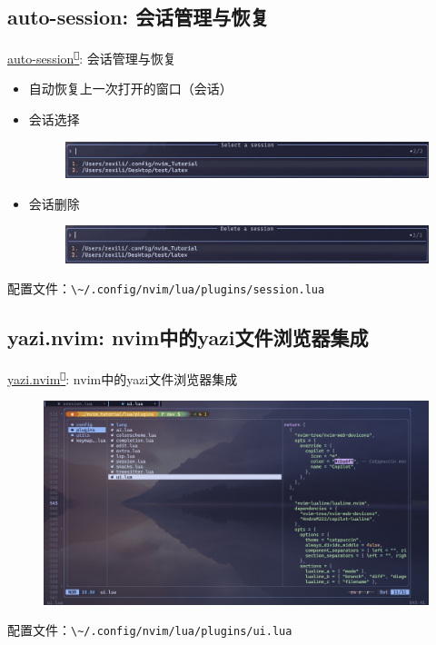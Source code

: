 \documentclass[aspectratio=169]{ctexbeamer}
\newcommand{\nerd}[1]{\texttt{#1}}
\newcommand{\link}[3][]{\href{#3}{#2\textsuperscript{\nerd{}}}}
\begin{document}
\subsection{auto-session: 会话管理与恢复}
\begin{frame}{\link{auto-session}{https://github.com/rmagatti/auto-session}: 会话管理与恢复}
  \begin{itemize}
    \item 自动恢复上一次打开的窗口（会话）
    \item 会话选择
      \begin{figure}[H]
        \centering
        \includegraphics[width=0.8\linewidth]{./Figures/Autosession_Finish_1.jpg}
      \end{figure}
    \item 会话删除
      \begin{figure}[H]
        \centering
        \includegraphics[width=0.8\linewidth]{./Figures/Autosession_Finish_2.jpg}
      \end{figure}
  \end{itemize}
  配置文件：\lstinline[language={},style=path]{\~/.config/nvim/lua/plugins/session.lua}
\end{frame}

\subsection{yazi.nvim: nvim中的yazi文件浏览器集成}
\begin{frame}{\link{yazi.nvim}{https://github.com/mikavilpas/yazi.nvim}: nvim中的yazi文件浏览器集成}
  \begin{figure}[H]
    \centering
    \includegraphics[width=0.65\linewidth]{./Figures/Yazi_Finish.jpg}
  \end{figure}
  配置文件：\lstinline[language={},style=path]{\~/.config/nvim/lua/plugins/ui.lua}
\end{frame}
\end{document}

